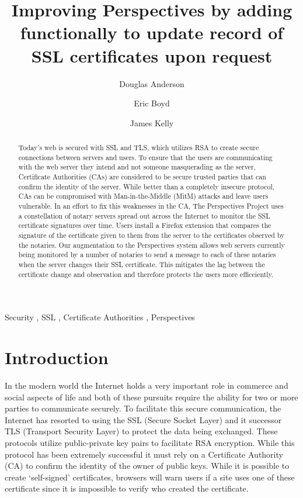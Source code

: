 \documentclass[preprint,review,12pt]{elsarticle}
\begin{document}
\begin{frontmatter}

\title{Improving Perspectives by adding functionally to update record of SSL certificates upon request}

\author[doug]{Douglas Anderson}
\author[eric]{Eric Boyd}
\author[james]{James Kelly}
\address[doug]{dander01@uoguelph.ca}
\address[eric]{boyde@uoguelph.ca}
\address[james]{kellyj@uoguelph.ca}


\begin{abstract}

Today's web is secured with SSL and TLS, which utilizes RSA to create secure
connections between servers and users. To ensure that the users are
communicating with the web server they intend and not someone masquerading as
the server, Certificate Authorities (CAs) are considered to be secure trusted
parties that can confirm the identity of the server. While better than a 
completely insecure protocol, CAs can be compromised with Man-in-the-Middle
(MitM) attacks and leave users vulnerable. In an effort to fix this
weaknesses in the CA, The Perspectives Project uses a
constellation of notary servers spread out across the Internet to monitor the
SSL certificate signatures over time. Users install a Firefox extension that
compares the signature of the certificate given to them from the server to the
certificates observed by the notaries. Our augmentation to the Perspectives
system allows web servers currently being monitored by a number of notaries to
send a message to each of these notaries when the server changes their SSL 
certificate. This mitigates the lag between the certificate change and 
observation and therefore protects the users more efficeiently.

\end{abstract}

\begin{keyword}
Security \sep
SSL \sep
Certificate Authorities \sep
Perspectives
\end{keyword}

\end{frontmatter}

\section{Introduction}
\label{intro}

In the modern world the Internet holds a very important role in commerce and
social aspects of life and both of these pursuits require the ability for two or
more parties to communicate securely. To facilitate this secure communication,
the Internet has resorted to using the SSL (Secure Socket Layer) and it
successor TLS (Transport Security Layer) to protect the data being exchanged.
These protocols utilize public-private key pairs to facilitate RSA encryption.
While this protocol has been extremely successful it must rely on a Certificate Authority (CA) to
confirm the identity of the owner of public keys. While it is possible to
create `self-signed' certificates, browsers will warn users if a site uses one
of these certificate since it is impossible to verify who created the
certificate. 
\end{document}
